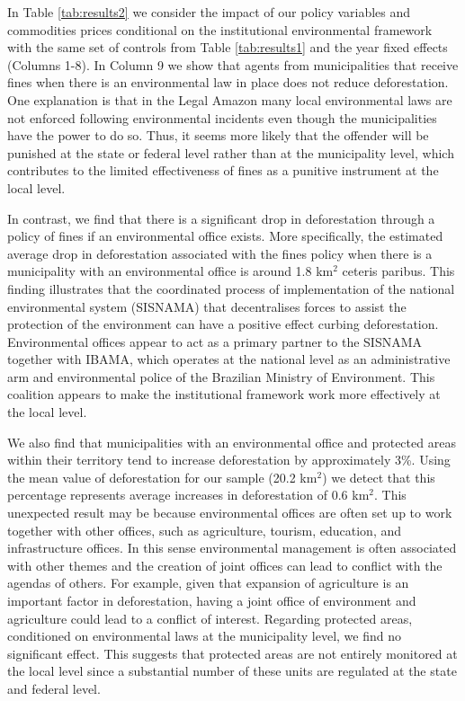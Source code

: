 In Table \ref{tab:results2} we consider the impact of our policy variables and commodities prices conditional on the institutional environmental framework with the same set of controls from Table \ref{tab:results1} and the year fixed effects (Columns 1-8). In Column 9 we show that agents from municipalities that receive fines when there is an environmental law in place does not reduce deforestation. One explanation is that in the Legal Amazon many local environmental laws are not enforced following environmental incidents even though the municipalities have the power to do so. Thus, it seems more likely that the offender will be punished at the state or federal level rather than at the municipality level, which contributes to the limited effectiveness of fines as a punitive instrument at the local level.

In contrast, we find that there is a significant drop in deforestation through a policy of fines if an environmental office exists. More specifically, the estimated average drop in deforestation associated with the fines policy when there is a municipality with an environmental office is around 1.8 km$^{2}$ ceteris paribus. This finding illustrates that the coordinated process of implementation of the national environmental system (SISNAMA) that decentralises forces to assist the protection of the environment can have a positive effect curbing deforestation. Environmental offices appear to act as a primary partner to the SISNAMA together with IBAMA, which operates at the national level as an administrative arm and environmental police of the Brazilian Ministry of Environment. This coalition appears to make the institutional framework work more effectively at the local level. 

We also find that municipalities with an environmental office and protected areas within their territory tend to increase deforestation by approximately 3\%. Using the mean value of deforestation for our sample (20.2 km$^{2}$) we detect that this percentage represents average increases in deforestation of 0.6 km$^{2}$. This unexpected result may be because environmental offices are often set up to work together with other offices, such as agriculture, tourism, education, and infrastructure offices. In this sense environmental management is often associated with other themes and the creation of joint offices can lead to conflict with the agendas of others. For example, given that expansion of agriculture is an important factor in deforestation, having a joint office of environment and agriculture could lead to a conflict of interest. Regarding protected areas, conditioned on environmental laws at the municipality level, we find no significant effect.  This suggests that protected areas are not entirely monitored at the local level since a substantial number of these units are regulated at the state and federal level. 

